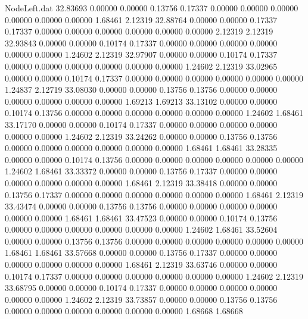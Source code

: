 \begin{filecontents}{NodeLeft.dat}
  32.83693    0.00000    0.00000     0.13756    0.17337    0.00000    0.00000    0.00000    0.00000    0.00000    0.00000    1.68461    2.12319
  32.88764    0.00000    0.00000     0.17337    0.17337    0.00000    0.00000    0.00000    0.00000    0.00000    0.00000    2.12319    2.12319
  32.93843    0.00000    0.00000     0.10174    0.17337    0.00000    0.00000    0.00000    0.00000    0.00000    0.00000    1.24602    2.12319
  32.97907    0.00000    0.00000     0.10174    0.17337    0.00000    0.00000    0.00000    0.00000    0.00000    0.00000    1.24602    2.12319
  33.02965    0.00000    0.00000     0.10174    0.17337    0.00000    0.00000    0.00000    0.00000    0.00000    0.00000    1.24837    2.12719
  33.08030    0.00000    0.00000     0.13756    0.13756    0.00000    0.00000    0.00000    0.00000    0.00000    0.00000    1.69213    1.69213
  33.13102    0.00000    0.00000     0.10174    0.13756    0.00000    0.00000    0.00000    0.00000    0.00000    0.00000    1.24602    1.68461
  33.17170    0.00000    0.00000     0.10174    0.17337    0.00000    0.00000    0.00000    0.00000    0.00000    0.00000    1.24602    2.12319
  33.24262    0.00000    0.00000     0.13756    0.13756    0.00000    0.00000    0.00000    0.00000    0.00000    0.00000    1.68461    1.68461
  33.28335    0.00000    0.00000     0.10174    0.13756    0.00000    0.00000    0.00000    0.00000    0.00000    0.00000    1.24602    1.68461
  33.33372    0.00000    0.00000     0.13756    0.17337    0.00000    0.00000    0.00000    0.00000    0.00000    0.00000    1.68461    2.12319
  33.38418    0.00000    0.00000     0.13756    0.17337    0.00000    0.00000    0.00000    0.00000    0.00000    0.00000    1.68461    2.12319
  33.43474    0.00000    0.00000     0.13756    0.13756    0.00000    0.00000    0.00000    0.00000    0.00000    0.00000    1.68461    1.68461
  33.47523    0.00000    0.00000     0.10174    0.13756    0.00000    0.00000    0.00000    0.00000    0.00000    0.00000    1.24602    1.68461
  33.52604    0.00000    0.00000     0.13756    0.13756    0.00000    0.00000    0.00000    0.00000    0.00000    0.00000    1.68461    1.68461
  33.57668    0.00000    0.00000     0.13756    0.17337    0.00000    0.00000    0.00000    0.00000    0.00000    0.00000    1.68461    2.12319
  33.63746    0.00000    0.00000     0.10174    0.17337    0.00000    0.00000    0.00000    0.00000    0.00000    0.00000    1.24602    2.12319
  33.68795    0.00000    0.00000     0.10174    0.17337    0.00000    0.00000    0.00000    0.00000    0.00000    0.00000    1.24602    2.12319
  33.73857    0.00000    0.00000     0.13756    0.13756    0.00000    0.00000    0.00000    0.00000    0.00000    0.00000    1.68668    1.68668

\end{filecontents}
